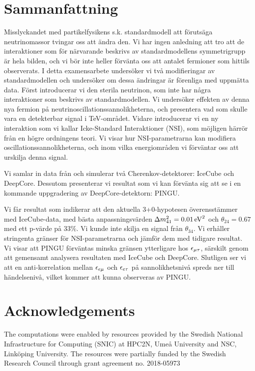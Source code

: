 \chapter*{Sammanfattning}
Misslyckandet med partikelfysikens s.k. standardmodell att förutsäga neutrinomassor tvingar oss att ändra den. Vi har ingen anledning att tro att
de interaktioner som för närvarande beskrivs av standardmodellens symmetrigrupp är hela bilden, och vi bör inte heller förvänta oss att antalet fermioner som hittils observerats.
I detta examensarbete undersöker vi två modifieringar av standardmodellen och undersöker om dessa ändringar är förenliga med uppmätta data.
Först introducerar vi den sterila neutrinon, som inte har några interaktioner som beskrivs av standardmodellen. Vi undersöker effekten av denna
nya fermion på neutrinoscillationssannolikheterna, och presentera vad som skulle vara en detekterbar signal i \si{\TeV}-området.
Vidare introducerar vi en ny interaktion som vi kallar Icke-Standard Interaktioner (NSI), som möjligen härrör från en högre ordningens teori.
Vi visar hur NSI-parametrarna kan modifiera oscillationssannolikheterna, och inom vilka energiområden vi förväntar oss att urskilja denna signal.

Vi samlar in data från och simulerar två Cherenkov-detektorer: IceCube och DeepCore. Dessutom presenterar vi resultat som vi
kan förvänta sig att se i en kommande uppgradering av DeepCore-detektorn: PINGU.

Vi får resultat som indikerar att den aktuella 3+0-hypotesen överensstämmer med IceCube-data, med bästa anpassningsvärden
$\dm[41] = \SI{0.01}{\eV^2}$ och $\theta_{24} = 0.67 $ med
ett p-värde på $33\%$. Vi kunde inte skilja en signal från $\theta_{34}$.
Vi erhåller stringenta gränser för NSI-parametrarna och jämför dem med tidigare resultat. Vi visar att PINGU förväntas minska gränsen ytterligare
hos $\epsilon_{\mu\tau}$, särskilt genom att gemensamt analysera resultaten med IceCube och DeepCore. Slutligen ser vi att en anti-korrelation mellan
$\epsilon_{e\mu}$ och $\epsilon_{e\tau}$ på sannolikhetsnivå spreds ner till händelsenivå, vilket kommer att kunna observeras av PINGU.

\chapter*{Acknowledgements}
The computations were enabled by resources provided by the Swedish
National Infrastructure for Computing (SNIC) at HPC2N, Umeå University
and NSC, Linköping University. The resources were partially funded by the Swedish Research 
Council through grant agreement no. 2018-05973